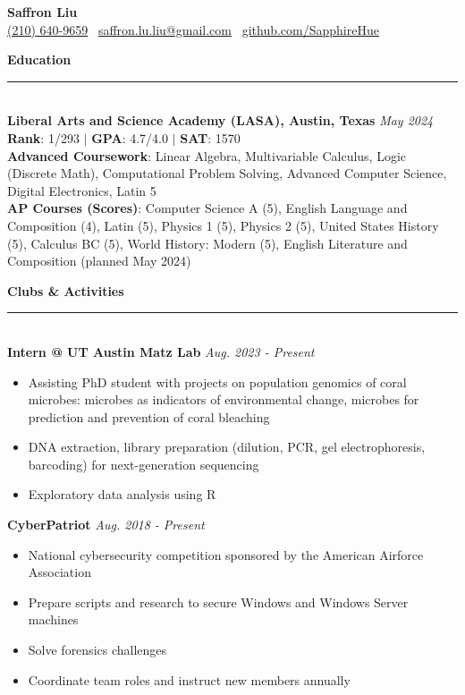 \documentclass{article}
\begin{document}
\begin{center}
    \LARGE{\textbf{Saffron Liu}} \\
    \normalsize{}
    \href{tel:2106409659}{(210) 640-9659} \textbullet\ \href{mailto:saffron.lu.liu@gmail.com}{saffron.lu.liu@gmail.com}  \textbullet\ \href{https:\\github.com/SapphireHue}{github.com/SapphireHue}
\end{center}
\begin{flushleft}
    \Large{\textbf{Education}} \normalsize
    \rule[10pt]{\textwidth}{0.4pt}\\[-.15in]
    \textbf{Liberal Arts and Science Academy (LASA), Austin, Texas} \hfill \textsl{May 2024}\\
    \textbf{Rank}: 1/293 $\mid$ \textbf{GPA}: 4.7/4.0 $\mid$ \textbf{SAT}: 1570\\
    \textbf{Advanced Coursework}: Linear Algebra, Multivariable Calculus, Logic (Discrete Math), Computational Problem Solving, Advanced Computer Science, Digital Electronics, Latin 5\\
    \textbf{AP Courses (Scores)}: Computer Science A (5), English Language and Composition (4), Latin (5), Physics 1 (5), Physics 2 (5), United States History (5), Calculus BC (5), World History: Modern (5), English Literature and Composition (planned May 2024)

    \vspace{11pt}
    \Large{\textbf{Clubs \& Activities}} \normalsize
    \rule[10pt]{\textwidth}{0.4pt}\\[-.15in]

    \textbf{Intern @ UT Austin Matz Lab} \hfill \textsl{Aug. 2023 - Present}
    \begin{itemize}
        \setlength\itemsep{-0.2em}
        \item Assisting PhD student with projects on population genomics of coral microbes: microbes as indicators of environmental change, microbes for prediction and prevention of coral bleaching
        \item DNA extraction, library preparation (dilution, PCR, gel electrophoresis, barcoding) for next-generation sequencing
        \item Exploratory data analysis using R
    \end{itemize}

    \textbf{CyberPatriot} \hfill \textsl{Aug. 2018 - Present}
    \begin{itemize}
        \setlength\itemsep{-0.2em}
        \item National cybersecurity competition sponsored by the American Airforce Association
        \item Prepare scripts and research to secure Windows and Windows Server machines
        \item Solve forensics challenges
        \item Coordinate team roles and instruct new members annually
    \end{itemize}


\end{flushleft}
\end{document}

